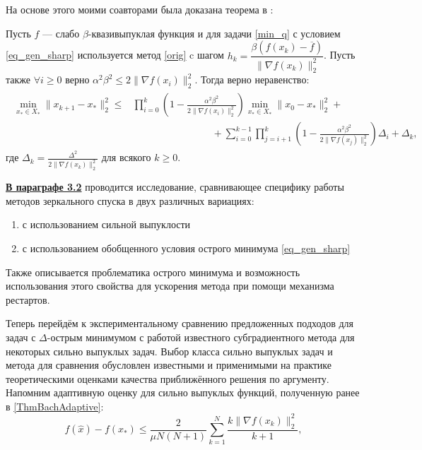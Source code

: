 На основе этого моими соавторами была доказана теорема в \cite{sharp22}:
\begin{theorem}\label{theorem1}
Пусть $f$ --- слабо $\beta$-квазивыпуклая функция и для задачи \eqref{min_q} с условием \eqref{eq_gen_sharp} используется метод \eqref{orig} c шагом
$h_k = \dfrac{\beta(f(x_k) - \overline{f})}{\| \nabla f(x_k) \|_2^2}$. Пусть также $\forall i \geq 0$ верно $\alpha^2 \beta^2 \leq 2 \| \nabla f(x_i) \|_2^2$. Тогда верно неравенство:
\begin{gather}\label{adaptive_estimate}
    \begin{aligned}
    \min_{x_* \in X_*} \|x_{k+1} - x_* \|_2^2 \leq &  \prod_{i=0}^k \left ( 1 - \frac{\alpha^2\beta^2}{2 \| \nabla f(x_i) \|_2^2} \right ) \min_{x_* \in X_*} \|x_0 - x_* \|_2^2 + \\& 
    \qquad \qquad \qquad \qquad + \sum_{i=0}^{k-1} \prod_{j=i+1}^k \left ( 1 - \frac{\alpha^2\beta^2}{2 \| \nabla f(x_j) \|_2^2} \right )\Delta_i + \Delta_k,
    \end{aligned}
\end{gather}
где $\Delta_k = \frac{\Delta^2}{2 \| \nabla f(x_k) \|_2^2}$ для всякого $k \geqslant 0$.
\end{theorem}

\underline{\textbf{В параграфе 3.2}} проводится исследование, сравнивающее специфику работы методов зеркального спуска в двух различных вариациях: 
\begin{enumerate}
    \item с использованием сильной выпуклости
    \item с использованием обобщенного условия острого минимума \eqref{eq_gen_sharp}
\end{enumerate}
Также описывается проблематика острого минимума и возможность использования этого свойства для ускорения метода при помощи механизма рестартов.

Теперь перейдём к экспериментальному сравнению предложенных подходов для задач с $\Delta$-острым минимумом с работой известного субградиентного метода \cite{Bach_2012} для некоторых сильно выпуклых задач. Выбор класса сильно выпуклых задач и метода \cite{Bach_2012} для сравнения обусловлен известными и  применимыми на практике теоретическими оценками качества приближённого решения по аргументу. Напомним адаптивную оценку для сильно выпуклых функций, полученную ранее в \ref{ThmBachAdaptive}:
\begin{equation}
    f(\widehat{x}) - f(x_*) \leq \frac{2}{\mu N (N+1)} \sum_{k=1}^{N} \frac{k \|\nabla f(x_k)\|_2^2}{k+1},
\end{equation} 

